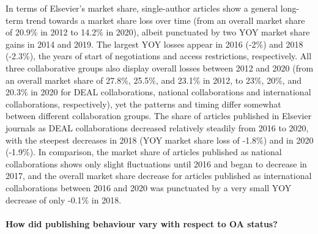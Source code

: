 \documentclass[
]{article}
\begin{document}
In terms of Elsevier's market share, single-author articles show a general long-term trend towards a market share loss over time (from an overall market share of 20.9\% in 2012 to 14.2\% in 2020), albeit punctuated by two YOY market share gains in 2014 and 2019. The largest YOY losses appear in 2016 (-2\%) and 2018 (-2.3\%), the years of start of negotiations and access restrictions, respectively. All three collaborative groups also display overall losses between 2012 and 2020 (from an overall market share of 27.8\%, 25.5\%, and 23.1\% in 2012, to 23\%, 20\%, and 20.3\% in 2020 for DEAL collaborations, national collaborations and international collaborations, respectively), yet the patterns and timing differ somewhat between different collaboration groups. The share of articles published in Elsevier journals as DEAL collaborations decreased relatively steadily from 2016 to 2020, with the steepest decreases in 2018 (YOY market share loss of -1.8\%) and in 2020 (-1.9\%). In comparison, the market share of articles published as national collaborations shows only slight fluctuations until 2016 and began to decrease in 2017, and the overall market share decrease for articles published as international collaborations between 2016 and 2020 was punctuated by a very small YOY decrease of only -0.1\% in 2018.

\hypertarget{how-did-publishing-behaviour-vary-with-respect-to-oa-status}{%
\paragraph{How did publishing behaviour vary with respect to OA status?}\label{how-did-publishing-behaviour-vary-with-respect-to-oa-status}}
\end{document}
